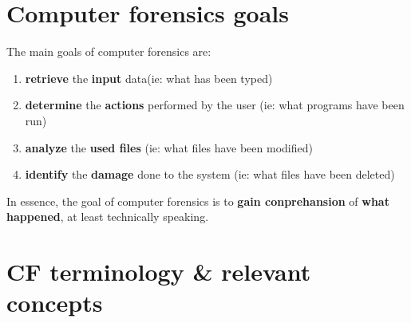 \section{Computer forensics goals}
The main goals of computer forensics are:
\begin{enumerate}
  \item \textbf{retrieve} the \textbf{input} data(ie: what has been typed)
  \item \textbf{determine} the \textbf{actions} performed by the user (ie: what programs
    have been run)
  \item \textbf{analyze} the \textbf{used files} (ie: what files have been
    modified)
  \item \textbf{identify} the \textbf{damage} done to the system (ie: what
    files have been deleted)
\end{enumerate}
\begin{boxH}
  In essence, the goal of computer forensics is to \textbf{gain conprehansion}
  of \textbf{what happened}, at least technically speaking.
\end{boxH}

\section{CF terminology \& relevant concepts}
